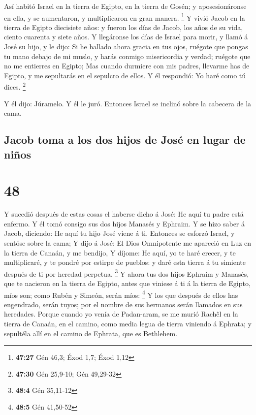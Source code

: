  Así habitó Israel en la tierra de Egipto, en la tierra
de Gosén; y aposesionáronse en ella, y se aumentaron, y multiplicaron en
gran manera. \footnote{\textbf{47:27} Gén 46,3; Éxod 1,7; Éxod 1,12}
 Y vivió Jacob en la tierra de Egipto diecisiete años: y
fueron los días de Jacob, los años de su vida, ciento cuarenta y siete
años.  Y llegáronse los días de Israel para morir, y
llamó á José su hijo, y le dijo: Si he hallado ahora gracia en tus ojos,
ruégote que pongas tu mano debajo de mi muslo, y harás conmigo
misericordia y verdad; ruégote que no me entierres en Egipto;
 Mas cuando durmiere con mis padres, llevarme has de
Egipto, y me sepultarás en el sepulcro de ellos. Y él respondió: Yo haré
como tú dices. \footnote{\textbf{47:30} Gén 25,9-10; Gén 49,29-32}

 Y él dijo: Júramelo. Y él le juró. Entonces Israel se
inclinó sobre la cabecera de la cama.

\hypertarget{jacob-toma-a-los-dos-hijos-de-josuxe9-en-lugar-de-niuxf1os}{%
\subsection{Jacob toma a los dos hijos de José en lugar de
niños}\label{jacob-toma-a-los-dos-hijos-de-josuxe9-en-lugar-de-niuxf1os}}

\hypertarget{section-47}{%
\section{48}\label{section-47}}

 Y sucedió después de estas cosas el haberse dicho á José:
He aquí tu padre está enfermo. Y él tomó consigo sus dos hijos Manasés y
Ephraim.  Y se hizo saber á Jacob, diciendo: He aquí tu
hijo José viene á ti. Entonces se esforzó Israel, y sentóse sobre la
cama;  Y dijo á José: El Dios Omnipotente me apareció en
Luz en la tierra de Canaán, y me bendijo,  Y díjome: He
aquí, yo te haré crecer, y te multiplicaré, y te pondré por estirpe de
pueblos: y daré esta tierra á tu simiente después de ti por heredad
perpetua. \footnote{\textbf{48:4} Gén 35,11-12}  Y ahora
tus dos hijos Ephraim y Manasés, que te nacieron en la tierra de Egipto,
antes que viniese á ti á la tierra de Egipto, míos son; como Rubén y
Simeón, serán míos: \footnote{\textbf{48:5} Gén 41,50-52} 
Y los que después de ellos has engendrado, serán tuyos; por el nombre de
sus hermanos serán llamados en sus heredades.  Porque
cuando yo venía de Padan-aram, se me murió Rachêl en la tierra de
Canaán, en el camino, como media legua de tierra viniendo á Ephrata; y
sepultéla allí en el camino de Ephrata, que es Bethlehem.

